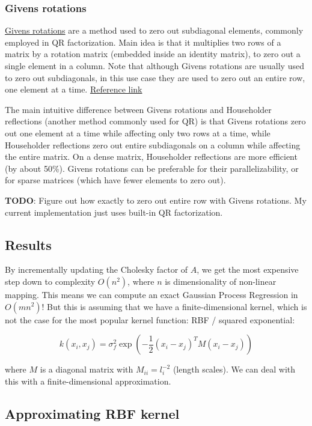 \documentclass[a4paper]{article}
\begin{document}
\subsubsection*{Givens rotations}

\href{https://en.wikipedia.org/wiki/Givens_rotation}{Givens rotations} are a method used to zero out subdiagonal elements, commonly employed in QR factorization. Main idea is that it multiplies two rows of a matrix by a rotation matrix (embedded inside an identity matrix), to zero out a single element in a column. Note that although Givens rotations are usually used to zero out subdiagonals, in this use case they are used to zero out an entire row, one element at a time. \href{http://drsfenner.org/blog/2016/03/givens-rotations-and-qr/}{Reference link}

The main intuitive difference between Givens rotations and Householder reflections (another method commonly used for QR) is that Givens rotations zero out one element at a time while affecting only two rows at a time, while Householder reflections zero out entire subdiagonals on a column while affecting the entire matrix. On a dense matrix, Householder reflections are more efficient (by about 50\%). Givens rotations can be preferable for their parallelizability, or for sparse matrices (which have fewer elements to zero out).  

\textbf{TODO}: Figure out how exactly to zero out entire row with Givens rotations. My current implementation just uses built-in QR factorization.

\subsection{Results}

By incrementally updating the Cholesky factor of $A$, we get the most expensive step down to complexity $O(n^2)$, where $n$ is dimensionality of non-linear mapping. This means we can compute an exact Gaussian Process Regression in $O(mn^2)$! But this is assuming that we have a finite-dimensional kernel, which is not the case for the most popular kernel function: RBF / squared exponential:

$$k(x_i, x_j) = \sigma_f^2 \exp(-\frac{1}{2}(x_i-x_j)^T M (x_i-x_j))$$

where $M$ is a diagonal matrix with $M_{ii}=l_i^{-2}$ (length scales). We can deal with this with a finite-dimensional approximation.

\subsection{Approximating RBF kernel}
\end{document}
